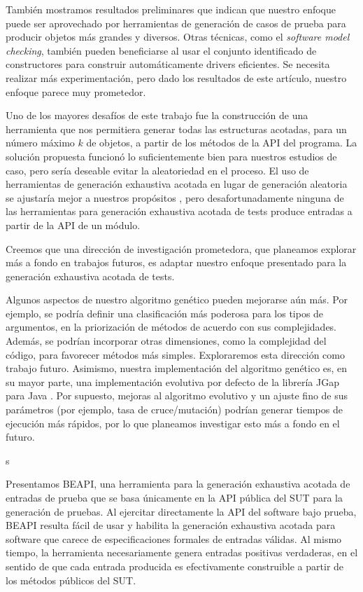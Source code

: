 También mostramos resultados preliminares que indican que nuestro enfoque puede ser aprovechado por herramientas de generación de casos de prueba para producir objetos más grandes y diversos. 
Otras técnicas, como el \emph{software model checking}, también pueden beneficiarse al usar el conjunto identificado de constructores para construir automáticamente drivers eficientes.
Se necesita realizar más experimentación, pero dado los resultados de este artículo, nuestro enfoque parece muy prometedor.

Uno de los mayores desafíos de este trabajo fue la construcción de una herramienta que nos permitiera generar todas las estructuras acotadas, 
para un número máximo $k$ de objetos, a partir de los métodos de la API del programa. La solución propuesta funcionó lo suficientemente bien para nuestros estudios de caso, 
pero sería deseable evitar la aleatoriedad en el proceso. El uso de herramientas de generación exhaustiva acotada en lugar de generación aleatoria se ajustaría mejor a nuestros propósitos \cite{Boyapati02}, 
pero desafortunadamente ninguna de las herramientas para generación exhaustiva acotada de tests produce entradas a partir de la API de un módulo.

Creemos que una dirección de investigación prometedora, que planeamos explorar más a fondo en trabajos futuros, 
es adaptar nuestro enfoque presentado para la generación exhaustiva acotada de tests.

Algunos aspectos de nuestro algoritmo genético pueden mejorarse aún más. 
Por ejemplo, se podría definir una clasificación más poderosa para los tipos de argumentos, en la priorización de métodos de acuerdo con sus complejidades. Además, se podrían incorporar otras dimensiones, 
como la complejidad del código, para favorecer métodos más simples. Exploraremos esta dirección como trabajo futuro. 
Asimismo, nuestra implementación del algoritmo genético es, en su mayor parte, una implementación evolutiva por defecto de la librería JGap para Java \cite{jgrapht}. 
Por supuesto, mejoras al algoritmo evolutivo y un ajuste fino de sus parámetros (por ejemplo, tasa de cruce/mutación) podrían generar tiempos de ejecución más rápidos, 
por lo que planeamos investigar esto más a fondo en el futuro.

s

Presentamos BEAPI, una herramienta para la generación exhaustiva acotada de entradas de prueba que se basa únicamente en la API pública del SUT para la generación de pruebas. 
Al ejercitar directamente la API del software bajo prueba, BEAPI resulta fácil de usar y habilita la generación exhaustiva acotada para software que carece de especificaciones formales de entradas válidas. 
Al mismo tiempo, la herramienta necesariamente genera entradas positivas verdaderas, en el sentido de que cada entrada producida es efectivamente construible a partir de los métodos públicos del SUT.

